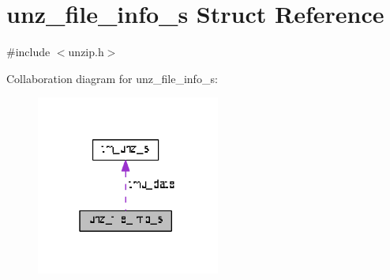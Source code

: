 \hypertarget{structunz__file__info__s}{}\section{unz\+\_\+file\+\_\+info\+\_\+s Struct Reference}
\label{structunz__file__info__s}


{\ttfamily \#include $<$unzip.\+h$>$}



Collaboration diagram for unz\+\_\+file\+\_\+info\+\_\+s\+:\nopagebreak
\begin{figure}[H]
\begin{center}
\leavevmode
\includegraphics[width=171pt]{structunz__file__info__s__coll__graph}
\end{center}
\end{figure}
